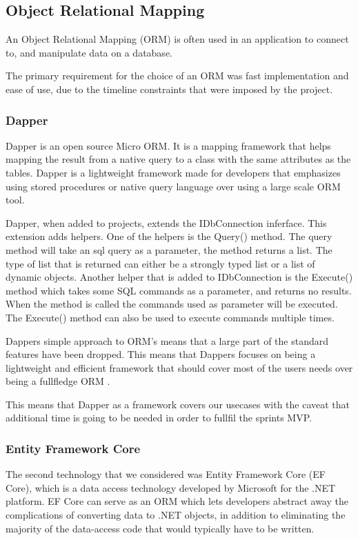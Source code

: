 \subsection{Object Relational Mapping}
An Object Relational Mapping (ORM) is often used in an application to connect to, and manipulate data on a database.

The primary requirement for the choice of an ORM was fast implementation and ease of use, due to the timeline constraints that were imposed by the \knox{} project. 

\subsubsection{Dapper}
Dapper is an open source Micro ORM. It is a mapping framework that helps mapping the result from a native query to a class with the same attributes as the tables. Dapper is a lightweight framework made for developers that emphasizes using stored procedures or native query language over using a large scale ORM tool. 


Dapper, when added to projects, extends the IDbConnection inferface. This extension adds helpers. 
One of the helpers is the Query() method. The query method will take an sql query as a parameter, the method returns a list. The type of list that is returned can either be a strongly typed list or a list of dynamic objects.
Another helper that is added to IDbConnection is the Execute() method which takes some SQL commands as a parameter, and returns no results. When the method is called the commands used as parameter will be executed. The Execute() method can also be used to execute commands multiple times\cite{Dapper_Git}.

Dappers simple approach to ORM's means that a large part of the standard features have been dropped. This means that Dappers focuses on being a lightweight and efficient framework that should cover most of the users needs over being a fullfledge ORM \cite{Dapper_Git}.

This means that Dapper as a framework covers our usecases with the caveat that additional time is going to be needed in order to fullfil the sprints MVP. 

\subsubsection{Entity Framework Core}
The second technology that we considered was Entity Framework Core (EF Core), which is a data access technology developed by Microsoft for the .NET platform. EF Core can serve as an ORM \cite{Object_relational_mapping} which lets developers abstract away the complications of converting data to .NET objects, in addition to eliminating the majority of the data-access code that would typically have to be written.

